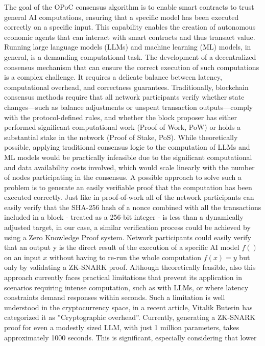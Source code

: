 \documentclass{article}
\begin{document}
The goal of the OPoC consensus algorithm is to enable smart contracts to trust general AI computations, ensuring that a specific model has been executed correctly on a specific input. This capability enables the creation of autonomous economic agents that can interact with smart contracts and thus transact value.
Running large language models (LLMs) and machine learning (ML) models, in general, is a demanding
computational task. The development of a decentralized consensus mechanism that can ensure the
correct execution of such computations is a complex challenge. It requires a delicate balance between
latency, computational overhead, and correctness guarantees.
Traditionally, blockchain consensus methods require that all network participants verify whether
state changes—such as balance adjustments or unspent transaction outputs—comply with the protocol-defined rules, and whether the block proposer has either performed significant computational work
(Proof of Work, PoW) or holds a substantial stake in the network (Proof of Stake, PoS). While theoretically possible, applying traditional consensus logic to the computation of LLMs
and ML models would be practically infeasible due to the significant computational and data availability costs involved, which would scale linearly with the number of nodes participating in the consensus.
A possible approach to solve such a problem is to generate an easily verifiable proof that the
computation has been executed correctly. Just like in proof-of-work all of the network participants can
easily verify that the SHA-256 hash of a nonce combined with all the transactions included in a block -
treated as a 256-bit integer - is less than a dynamically adjusted target, in our case, a similar verification
process could be achieved by using a Zero Knowledge Proof system. Network participants could easily
verify that an output y is the direct result of the execution of a specific AI model \( f() \) on an input \( x \) without having to re-run the whole computation \( f(x) = y \) but only by validating a ZK-SNARK proof.
Although theoretically feasible, also this approach currently faces practical limitations that prevent its
application in scenarios requiring intense computation, such as with LLMs, or where latency constraints
demand responses within seconds. Such a limitation is well understood in the cryptocurrency space,
in a recent article, Vitalik Buterin has categorized it as ”Cryptographic overhead”. Currently,
generating a ZK-SNARK proof for even a modestly sized LLM, with just 1 million parameters, takes
approximately 1000 seconds. This is significant, especially considering that lower
\end{document}
